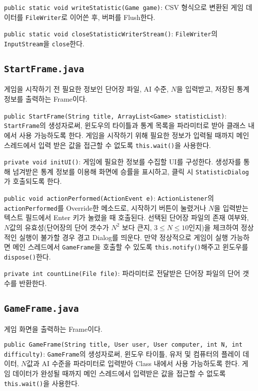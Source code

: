 \texttt{public static void writeStatistic(Game game)}:
CSV 형식으로 변환된 게임 데이터를 \texttt{FileWriter}로 이어쓴 후, 버퍼를 Flush한다.

\texttt{public static void closeStatisticWriterStream()}:
\texttt{FileWriter}의 \texttt{InputStream}을 \texttt{close}한다.

\subsection{\texttt{StartFrame.java}}
게임을 시작하기 전 필요한 정보인 단어장 파일, AI 수준, $N$을 입력받고, 저장된 통계 정보를 출력하는 Frame이다.

\texttt{public StartFrame(String title, ArrayList<Game> statisticList)}:
\texttt{StartFrame}의 생성자로써, 윈도우의 타이틀과 통계 목록을 파라미터로 받아 클래스 내에서 사용 가능하도록 한다.
게임을 시작하기 위해 필요한 정보가 입력될 때까지 메인 스레드에서 입력 받은 값을 접근할 수 없도록 \texttt{this.wait()}을 사용한다.

\texttt{private void initUI()}:
게임에 필요한 정보를 수집할 UI를 구성한다.
생성자를 통해 넘겨받은 통계 정보를 이용해 화면에 승률을 표시하고, 클릭 시 \texttt{StatisticDialog}가 호출되도록 한다.

\texttt{public void actionPerformed(ActionEvent e)}:
\texttt{ActionListener}의 \texttt{actionPerformed}를 Override한 메소드로,
시작하기 버튼이 눌렸거나 $N$을 입력받는 텍스트 필드에서 Enter 키가 눌렸을 때 호출된다.
선택된 단어장 파일의 존재 여부와, $N$값의 유효성(단어장의 단어 갯수가 $N^2$ 보다 큰지, $3 \leq N \leq 10$인지)을 체크하여 정상적인 실행이 불가할 경우 경고 Dialog를 띄운다.
만약 정상적으로 게임이 실행 가능하면 메인 스레드에서 \texttt{GameFrame}을 호출할 수 있도록 \texttt{this.notify()}해주고 윈도우를 \texttt{dispose()}한다.

\texttt{private int countLine(File file)}:
파라미터로 전달받은 단어장 파일의 단어 갯수를 반환한다.

\subsection{\texttt{GameFrame.java}}
게임 화면을 출력하는 Frame이다.

\texttt{public GameFrame(String title, User user, User computer, int N, int difficulty)}:
\texttt{GameFrame}의 생성자로써, 윈도우 타이틀, 유저 및 컴퓨터의 플레이 데이터, $N$값과 AI 수준을 파라미터로 입력받아 Class 내에서 사용 가능하도록 한다.
게임 데이터가 완성될 때까지 메인 스레드에서 입력받은 값을 접근할 수 없도록 \texttt{this.wait()}을 사용한다.

